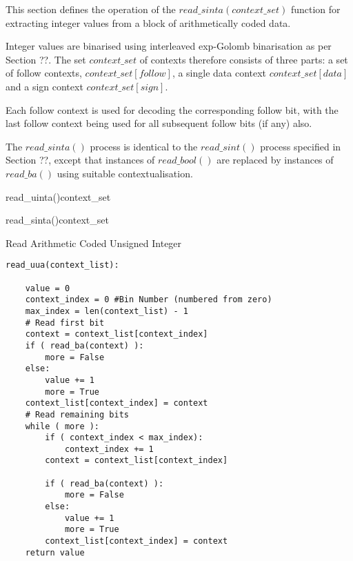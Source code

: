 This section defines the operation of the $read\_sinta(context\_set)$ function
 for extracting integer values from a block of arithmetically coded data.

Integer values are binarised using interleaved exp-Golomb binarisation as per
Section ??. The set $context\_set$ of contexts therefore consists of three parts: 
a set of follow contexts, $context\_set[follow]$, a single data context 
$context\_set[data]$ and a sign context $context\_set[sign]$.

Each follow context is used for decoding the corresponding follow bit, with the
last follow context being used for all subsequent follow bits (if any) also.

The $read\_sinta()$ process is identical to the $read\_sint()$ process
specified in Section ??, except that instances of $read\_bool()$ are replaced
by instances of $read\_ba()$ using suitable contextualisation.


\begin{pseudo}{read\_uinta()}{context\_set}

\end{pseudo}
\begin{pseudo}{read\_sinta()}{context\_set}
  \bsEND
\bsEND
\end{pseudo}

Read Arithmetic Coded Unsigned Integer
\begin{verbatim}
read_uua(context_list):

    value = 0
    context_index = 0 #Bin Number (numbered from zero)
    max_index = len(context_list) - 1
    # Read first bit
    context = context_list[context_index]
    if ( read_ba(context) ):
        more = False
    else:
        value += 1
        more = True
    context_list[context_index] = context
    # Read remaining bits
    while ( more ):
        if ( context_index < max_index):
            context_index += 1
        context = context_list[context_index]

        if ( read_ba(context) ):
            more = False
        else:
            value += 1
            more = True
        context_list[context_index] = context
    return value
\end{verbatim}
